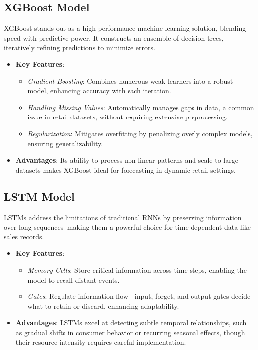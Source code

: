 \subsection{XGBoost Model}
XGBoost stands out as a high-performance machine learning solution, blending speed with predictive power. It constructs an ensemble of decision trees, iteratively refining predictions to minimize errors.
\begin{itemize}
    \item \textbf{Key Features}:
    \begin{itemize}
        \item \textit{Gradient Boosting}: Combines numerous weak learners into a robust model, enhancing accuracy with each iteration.
        \item \textit{Handling Missing Values}: Automatically manages gaps in data, a common issue in retail datasets, without requiring extensive preprocessing.
        \item \textit{Regularization}: Mitigates overfitting by penalizing overly complex models, ensuring generalizability.
    \end{itemize}
    \item \textbf{Advantages}: Its ability to process non-linear patterns and scale to large datasets makes XGBoost ideal for forecasting in dynamic retail settings.
\end{itemize}

\subsection{LSTM Model}
LSTMs address the limitations of traditional RNNs by preserving information over long sequences, making them a powerful choice for time-dependent data like sales records.
\begin{itemize}
    \item \textbf{Key Features}:
    \begin{itemize}
        \item \textit{Memory Cells}: Store critical information across time steps, enabling the model to recall distant events.
        \item \textit{Gates}: Regulate information flow—input, forget, and output gates decide what to retain or discard, enhancing adaptability.
    \end{itemize}
    \item \textbf{Advantages}: LSTMs excel at detecting subtle temporal relationships, such as gradual shifts in consumer behavior or recurring seasonal effects, though their resource intensity requires careful implementation.
\end{itemize}

